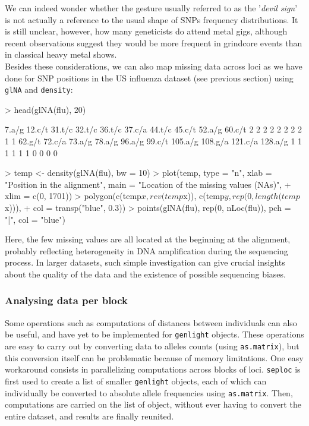 \documentclass{article}
\begin{document}
\noindent We can indeed wonder whether the gesture usually referred to as the '\textit{devil sign}'
is not actually a reference to the usual shape of SNPs frequency distributions.  It is still
unclear, however, how many geneticists do attend metal gigs, although recent observations suggest
they would be more frequent in grindcore events than in classical heavy metal shows.
\\

Besides these considerations, we can also map missing data across loci as we have done for SNP positions in the
US influenza dataset (see previous section) using \texttt{glNA} and \texttt{density}:
\begin{Schunk}
\begin{Sinput}
> head(glNA(flu), 20)
\end{Sinput}
\begin{Soutput}
  7.a/g  12.c/t  31.t/c  32.t/c  36.t/c  37.c/a  44.t/c  45.c/t  52.a/g  60.c/t 
      2       2       2       2       2       2       2       2       1       1 
 62.g/t  72.c/a  73.a/g  78.a/g  96.a/g  99.c/t 105.a/g 108.g/a 121.c/a 128.a/g 
      1       1       1       1       1       1       0       0       0       0 
\end{Soutput}
\begin{Sinput}
> temp <- density(glNA(flu), bw = 10)
> plot(temp, type = "n", xlab = "Position in the alignment", main = "Location of the missing values (NAs)", 
+     xlim = c(0, 1701))
> polygon(c(temp$x, rev(temp$x)), c(temp$y, rep(0, length(temp$x))), 
+     col = transp("blue", 0.3))
> points(glNA(flu), rep(0, nLoc(flu)), pch = "|", col = "blue")
\end{Sinput}
\end{Schunk}

\noindent Here, the few missing values are all located at the beginning at the alignment, probably
reflecting heterogeneity in DNA amplification during the sequencing process.
In larger datasets, such simple investigation can give crucial insights about the quality of
the data and the existence of possible sequencing biases.
\\




\subsubsection{Analysing data per block}

Some operations such as computations of distances between individuals can also be useful,
and have yet to be implemented for \texttt{genlight} objects.
These operations are easy to carry out by converting data to alleles counts (using
\texttt{as.matrix}), but this conversion itself can be problematic because of memory limitations.
One easy workaround consists in parallelizing computations across blocks of loci.
\texttt{seploc} is first used to create a list of smaller \texttt{genlight} objects, each of which
can individually be converted to absolute allele frequencies using \texttt{as.matrix}.
Then, computations are carried on the list of object, without ever having to convert the entire
dataset, and results are finally reunited.
\\
\end{document}
